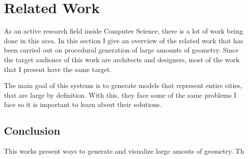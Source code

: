 
% 
% 

\section{Related Work}
\label{sec:related_work}

As an active research field inside Computer Science, there is a lot of work being done in this area. In this section I give an overview of the related work that has been carried out on procedural generation of large amounts of geometry. Since the target audience of this work are architects and designers, most of the work that I present have the same target.

The main goal of this systems is to generate models that represent entire cities, that are large by definition. With this, they face some of the same problems I face so it is important to learn about their solutions.






\subsection{Conclusion} %
\label{sub:conclusion}

This works present ways to generate and visualize large amouts of geometry. Th


